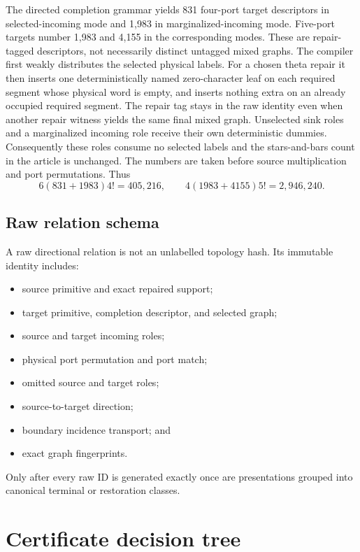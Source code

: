 \documentclass[11pt]{article}
\theoremstyle{remark}
\begin{document}
The directed completion grammar yields 831 four-port target descriptors in
selected-incoming mode and 1,983 in marginalized-incoming mode.  Five-port
targets number 1,983 and 4,155 in the corresponding modes.  These are
repair-tagged descriptors, not necessarily distinct untagged mixed graphs.
The compiler first weakly distributes the selected physical labels.  For a
chosen theta repair it then inserts one deterministically named zero-character
leaf on each required segment whose physical word is empty, and inserts
nothing extra on an already occupied required segment.  The repair tag stays
in the raw identity even when another repair witness yields the same final
mixed graph.  Unselected sink roles and a marginalized incoming role receive
their own deterministic dummies.  Consequently these roles consume no
selected labels and the stars-and-bars count in the article is unchanged.
The numbers are taken before source multiplication and port permutations.
Thus
\[
 6(831+1983)4!=405{,}216,\qquad
 4(1983+4155)5!=2{,}946{,}240.
\]

\subsection{Raw relation schema}

A raw directional relation is not an unlabelled topology hash.  Its immutable
identity includes:
\begin{itemize}
  \item source primitive and exact repaired support;
  \item target primitive, completion descriptor, and selected graph;
  \item source and target incoming roles;
  \item physical port permutation and port match;
  \item omitted source and target roles;
  \item source-to-target direction;
  \item boundary incidence transport; and
  \item exact graph fingerprints.
\end{itemize}
Only after every raw ID is generated exactly once are presentations grouped
into canonical terminal or restoration classes.

\section{Certificate decision tree}\label{sec:certificates}
\end{document}
